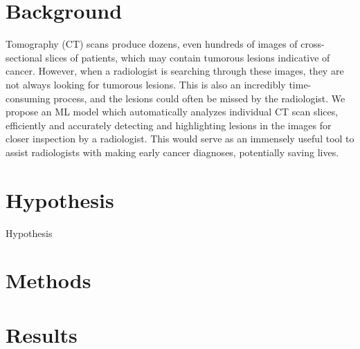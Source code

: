 \section{Background}


 Tomography (CT) scans produce dozens, even hundreds of images of cross-sectional slices of patients, which may contain tumorous lesions indicative of cancer. However, when a radiologist is searching through these images, they are not always looking for tumorous lesions. This is also an incredibly time-consuming process, and the lesions could often be missed by the radiologist. We propose an ML model which automatically analyzes individual CT scan slices, efficiently and accurately detecting and highlighting lesions in the images for closer inspection by a radiologist.  This would serve as an immensely useful tool to assist radiologists with making early cancer diagnoses, potentially saving lives.


\section{Hypothesis}
Hypothesis\cite{deeplesion}

\section{Methods}

\section{Results}

